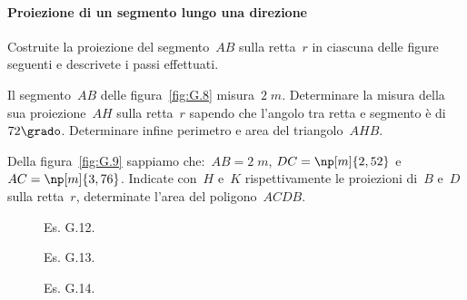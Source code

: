 \paragraph{Proiezione di un segmento lungo una direzione}
\begin{esercizio}
\label{ese:G.11}
Costruite la proiezione del segmento~$AB$ sulla retta~$r$ in ciascuna delle figure seguenti e descrivete i passi effettuati.
\begin{center}
 
\end{center}
\end{esercizio}

\begin{multicols}{2}
 \begin{esercizio}
\label{ese:G.12}
Il segmento~$AB$ delle figura~\ref{fig:G.8} misura~$2\;\unit{m}$. Determinare la misura della sua proiezione~$AH$ sulla retta~$r$ sapendo che l'angolo tra retta e
segmento è di~$72\grado$. Determinare infine perimetro e area del triangolo~$AHB$.
\end{esercizio}
\begin{esercizio}
\label{ese:G.13}
Della figura~\ref{fig:G.9} sappiamo che:~${AB}=2\;\unit{m}$, ${DC}=\np[m]{2,52}$ e ${AC}=\np[m]{3,76}$.
Indicate con~$H$ e~$K$ rispettivamente le proiezioni di~$B$ e~$D$ sulla retta~$r$, determinate l'area del poligono~$ACDB$.
\end{esercizio}
\end{multicols}

\begin{figure}[t]
 \begin{minipage}[t]{.25\textwidth}
 \centering
 
 \caption{Es. G.12.}\label{fig:G.8}
 \end{minipage}
 \begin{minipage}[t]{.45\textwidth}
 \centering
 
 \caption{Es. G.13.}\label{fig:G.9}
 \end{minipage}
 \begin{minipage}[t]{.25\textwidth}
 \centering
 
 \caption{Es. G.14.}\label{fig:G.10}
 \end{minipage}
\end{figure}

